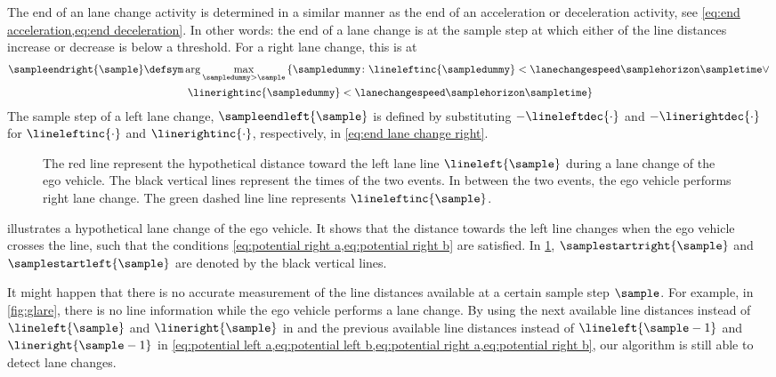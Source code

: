 The end of an lane change activity is determined in a similar manner as the end of an acceleration or deceleration activity, see \cref{eq:end acceleration,eq:end deceleration}.
In other words: the end of a lane change is at the sample step at which either of the line distances increase or decrease is below a threshold. For a right lane change, this is at
\begin{multline}
	\label{eq:end lane change right}
	\sampleendright{\sample} \defsym \arg \max_{\sampledummy > \sample} \left\{ \sampledummy\colon \lineleftinc{\sampledummy}<\lanechangespeed\samplehorizon\sampletime \lor \right.\\
	\left. \linerightinc{\sampledummy}< \lanechangespeed\samplehorizon\sampletime \right\}
\end{multline}
The sample step of a left lane change, $\sampleendleft{\sample}$ is defined by substituting $-\lineleftdec{\cdot}$ and $-\linerightdec{\cdot}$ for $\lineleftinc{\cdot}$ and $\linerightinc{\cdot}$, respectively, in \cref{eq:end lane change right}.
\cenda

\setlength{\figurewidth}{\linewidth}
\setlength{\figureheight}{0.6\linewidth}
\begin{figure}
	\centering
	
	\caption{\cstarta The red line represent the hypothetical distance toward the left lane line $\lineleft{\sample}$ during a lane change of the ego vehicle. The black vertical lines represent the times of the two events. In between the two events, the ego vehicle performs right lane change. The green dashed line line represents $\lineleftinc{\sample}$.\cenda}
	\label{fig:ego lane change}
\end{figure}

\cstarta
{} illustrates a hypothetical lane change of the ego vehicle. It shows that the distance towards the left line changes when the ego vehicle crosses the line, such that the conditions \cref{eq:potential right a,eq:potential right b} are satisfied. In \cref{fig:ego lane change}, $\samplestartright{\sample}$ and $\samplestartleft{\sample}$ are denoted by the black vertical lines.

\begin{remark}
	It might happen that there is no accurate measurement of the line distances available at a certain sample step $\sample$. For example, in \cref{fig:glare}, there is no line information while the ego vehicle performs a lane change. By using the next available line distances instead of $\lineleft{\sample}$ and $\lineright{\sample}$ in and the previous available line distances instead of $\lineleft{\sample-1}$ and $\lineright{\sample-1}$ in \cref{eq:potential left a,eq:potential left b,eq:potential right a,eq:potential right b}, our algorithm is still able to detect lane changes.
\end{remark}
\cenda


